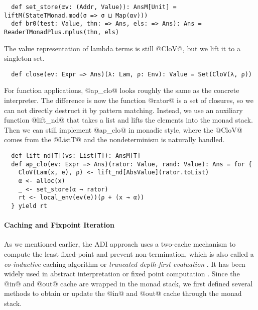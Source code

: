 \begin{lstlisting}
  def set_store(αv: (Addr, Value)): AnsM[Unit] = liftM(StateTMonad.mod(σ => σ ⊔ Map(αv)))
  def br0(test: Value, thn: => Ans, els: => Ans): Ans = ReaderTMonadPlus.mplus(thn, els)
\end{lstlisting}

The value representation of lambda terms is still @CloV@, but we lift it to a
singleton set.

\begin{lstlisting}
  def close(ev: Expr => Ans)(λ: Lam, ρ: Env): Value = Set(CloV(λ, ρ))
\end{lstlisting}

For function applications, @ap_clo@ looks roughly the same as the concrete
interpreter. The difference is now the function @rator@ is a set of closures, so
we can not directly destruct it by pattern matching. Instead, we use an
auxiliary function @lift_nd@ that takes a list and lifts the elements into the
monad stack. Then we can still implement @ap_clo@ in monadic style, where the
@CloV@ comes from the @ListT@ and the nondeterminism is naturally handled.

\begin{lstlisting}
  def lift_nd[T](vs: List[T]): AnsM[T]
  def ap_clo(ev: Expr => Ans)(rator: Value, rand: Value): Ans = for {
    CloV(Lam(x, e), ρ) <- lift_nd[AbsValue](rator.toList)
    α <- alloc(x)
    _ <- set_store(α → rator)
    rt <- local_env(ev(e))(ρ + (x → α))
  } yield rt
\end{lstlisting}


\paragraph{Caching and Fixpoint Iteration}

As we mentioned earlier, the ADI approach uses a two-cache mechanism to
compute the least fixed-point and prevent non-termination, which is also called a
\textit{co-inductive} caching algorithm or \textit{truncated depth-first
evaluation} \cite{Rosendahl:AbsIntPL}. It has been widely used in abstract
interpretation or fixed point computation
\cite{DBLP:journals/pacmpl/DaraisLNH17, Wei:2018:RAA:3243631.3236800,
Rosendahl:AbsIntPL}. Since the @in@ and @out@ cache are wrapped in the monad
stack, we first defined several methods to obtain or update the @in@ and @out@
cache through the monad stack.

